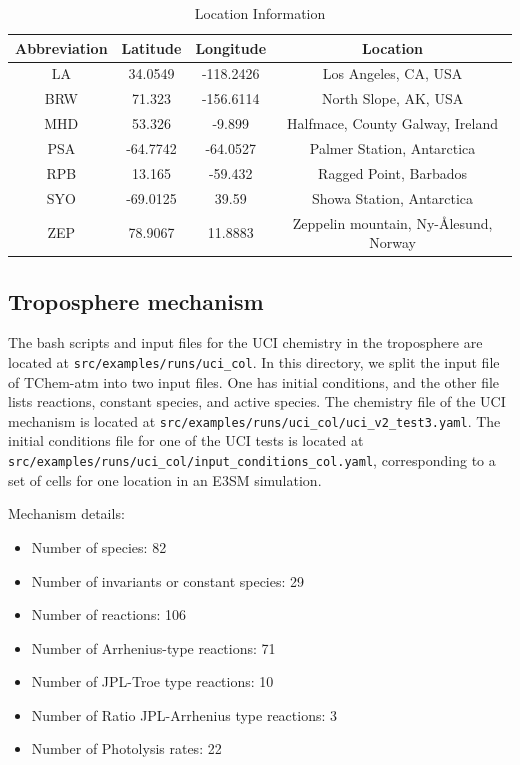 \documentclass[report, 12pt]{SANDreport}
\begin{document}
\begin{table}[htbp]
    \centering
    \begin{tabular}{|c|c|c|c|}
        \hline
        Abbreviation & Latitude & Longitude & Location \\
        \hline
        LA & 34.0549 & -118.2426 & Los Angeles, CA, USA \\
        BRW & 71.323 & -156.6114 & North Slope, AK, USA \\
        MHD & 53.326 & -9.899 & Halfmace, County Galway, Ireland \\
        PSA & -64.7742 & -64.0527 & Palmer Station, Antarctica \\
        RPB & 13.165 & -59.432 & Ragged Point, Barbados \\
        SYO & -69.0125 & 39.59 & Showa Station, Antarctica \\
        ZEP & 78.9067 & 11.8883 & Zeppelin mountain, Ny-\AA lesund, Norway \\
        \hline
    \end{tabular}
    \caption{Location Information}
    \label{tab:location-info}
\end{table}


\subsection{Troposphere mechanism}

The bash scripts and input files for the UCI chemistry in the troposphere are located at \verb|src/examples/runs/uci_col|. In this directory, we split the input file of TChem-atm into two input files. One has initial conditions, and the other file lists reactions, constant species, and active species. The chemistry file of the UCI mechanism is located at \verb|src/examples/runs/uci_col/uci_v2_test3.yaml|. The initial conditions file for one of the UCI tests is located at \verb|src/examples/runs/uci_col/input_conditions_col.yaml|, corresponding to a set of cells for one location in an E3SM simulation.

Mechanism details:

\begin{itemize}
    \item Number of species: 82
    \item Number of invariants or constant species: 29
    \item Number of reactions: 106
    \item Number of Arrhenius-type reactions: 71
    \item Number of JPL-Troe type reactions: 10
    \item Number of Ratio JPL-Arrhenius type reactions: 3
    \item Number of Photolysis rates: 22
\end{itemize}
\end{document}
